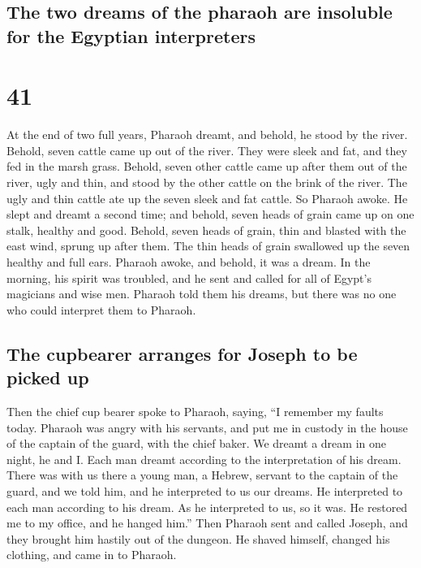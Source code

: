 \hypertarget{the-two-dreams-of-the-pharaoh-are-insoluble-for-the-egyptian-interpreters}{%
\subsection{The two dreams of the pharaoh are insoluble for the Egyptian
interpreters}\label{the-two-dreams-of-the-pharaoh-are-insoluble-for-the-egyptian-interpreters}}

\hypertarget{section-40}{%
\section{41}\label{section-40}}

 At the end of two full years, Pharaoh dreamt, and behold,
he stood by the river.  Behold, seven cattle came up out
of the river. They were sleek and fat, and they fed in the marsh grass.
 Behold, seven other cattle came up after them out of the
river, ugly and thin, and stood by the other cattle on the brink of the
river.  The ugly and thin cattle ate up the seven sleek
and fat cattle. So Pharaoh awoke.  He slept and dreamt a
second time; and behold, seven heads of grain came up on one stalk,
healthy and good.  Behold, seven heads of grain, thin and
blasted with the east wind, sprung up after them.  The
thin heads of grain swallowed up the seven healthy and full ears.
Pharaoh awoke, and behold, it was a dream.  In the
morning, his spirit was troubled, and he sent and called for all of
Egypt's magicians and wise men. Pharaoh told them his dreams, but there
was no one who could interpret them to Pharaoh.

\hypertarget{the-cupbearer-arranges-for-joseph-to-be-picked-up}{%
\subsection{The cupbearer arranges for Joseph to be picked
up}\label{the-cupbearer-arranges-for-joseph-to-be-picked-up}}

 Then the chief cup bearer spoke to Pharaoh, saying, ``I
remember my faults today.  Pharaoh was angry with his
servants, and put me in custody in the house of the captain of the
guard, with the chief baker.  We dreamt a dream in one
night, he and I. Each man dreamt according to the interpretation of his
dream.  There was with us there a young man, a Hebrew,
servant to the captain of the guard, and we told him, and he interpreted
to us our dreams. He interpreted to each man according to his dream.
 As he interpreted to us, so it was. He restored me to my
office, and he hanged him.''  Then Pharaoh sent and
called Joseph, and they brought him hastily out of the dungeon. He
shaved himself, changed his clothing, and came in to Pharaoh.

